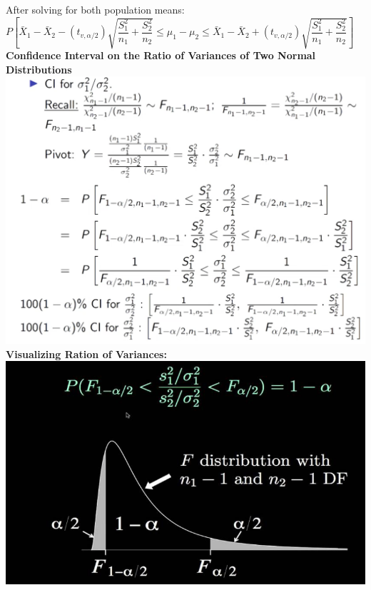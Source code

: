 \documentclass[]{article}
\begin{document}
\newline After solving for both population means:
\newline
\newline$P \left[ \bar{X}_1 - \bar{X}_2 - ( t_{v, \alpha / 2} )  \sqrt{\dfrac{S^2_1}{n_1} + \dfrac{S^2_2}{n_2}}  \le  \mu_1 - \mu_2 \le \bar{X}_1 - \bar{X}_2  + ( t_{v, \alpha /2} ) \sqrt{\dfrac{S^2_1}{n_1} + \dfrac{S^2_2}{n_2}}  \right]$
\newline 
\newline
\newline 
\newline
\newline 
\newline\Large\textbf{Confidence Interval on the Ratio of Variances of Two Normal Distributions}
\newline
\newline
\includegraphics[scale=0.8]{ratio_of_variances}
\newline
\newline \textbf{Visualizing Ration of Variances:}
\newline
\newline
\includegraphics[scale=0.99]{visualizing_ratio_variances}
 
\section{}
\end{document}
